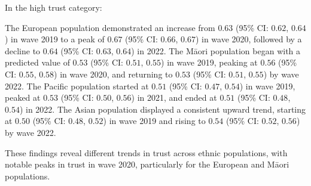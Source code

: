 \documentclass[
  single column]{article}
\begin{document}
In the high trust category:

The European population demonstrated an increase from \(0.63\) (95\% CI:
\(0.62\), \(0.64\)) in wave 2019 to a peak of \(0.67\) (95\% CI:
\(0.66\), \(0.67\)) in wave 2020, followed by a decline to \(0.64\)
(95\% CI: \(0.63\), \(0.64\)) in 2022. The Māori population began with a
predicted value of \(0.53\) (95\% CI: \(0.51\), \(0.55\)) in wave 2019,
peaking at \(0.56\) (95\% CI: \(0.55\), \(0.58\)) in wave 2020, and
returning to \(0.53\) (95\% CI: \(0.51\), \(0.55\)) by wave 2022. The
Pacific population started at \(0.51\) (95\% CI: \(0.47\), \(0.54\)) in
wave 2019, peaked at \(0.53\) (95\% CI: \(0.50\), \(0.56\)) in 2021, and
ended at \(0.51\) (95\% CI: \(0.48\), \(0.54\)) in 2022. The Asian
population displayed a consistent upward trend, starting at \(0.50\)
(95\% CI: \(0.48\), \(0.52\)) in wave 2019 and rising to \(0.54\) (95\%
CI: \(0.52\), \(0.56\)) by wave 2022.

These findings reveal different trends in trust across ethnic
populations, with notable peaks in trust in wave 2020, particularly for
the European and Māori populations.
\end{document}
